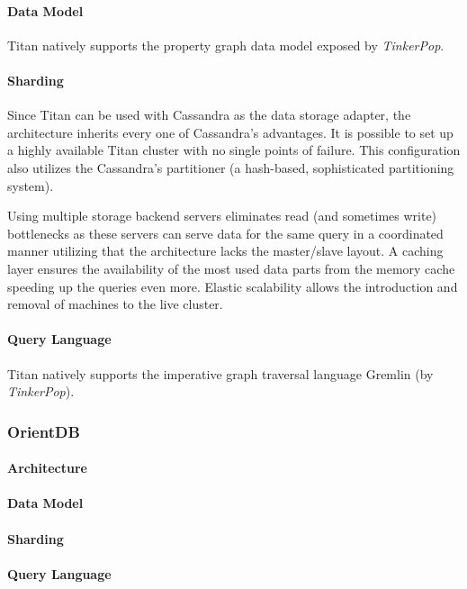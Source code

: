 \paragraph{Data Model}
Titan natively supports the property graph data model exposed by \emph{TinkerPop}.

\paragraph{Sharding}
Since Titan can be used with Cassandra as the data storage adapter, the architecture inherits every one of Cassandra's advantages. It is possible to set up a highly available Titan cluster with no single points of failure. This configuration also utilizes the Cassandra's partitioner (a hash-based, sophisticated partitioning system).

Using multiple storage backend servers eliminates read (and sometimes write) bottlenecks as these servers can serve data for the same query in a coordinated manner utilizing that the architecture lacks the master/slave layout. A caching layer ensures the availability of the most used data parts from the memory cache speeding up the queries even more. Elastic scalability allows the introduction and removal of machines to the live cluster.


\paragraph{Query Language}
Titan natively supports the imperative graph traversal language Gremlin (by \emph{TinkerPop}).


\subsubsection{OrientDB}
\paragraph{Architecture}
\paragraph{Data Model}
\paragraph{Sharding}
\paragraph{Query Language}



